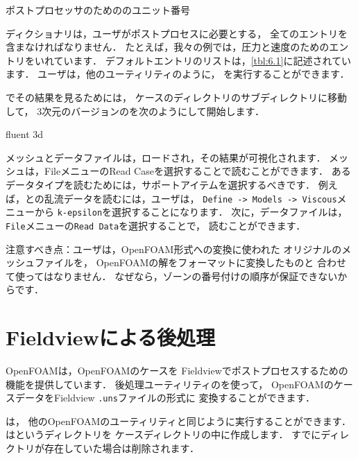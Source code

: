 \begin{table}[ht]
 
 \caption{ポストプロセッサのためののユニット番号}
 \label{tbl:6.1}
\end{table}


ディクショナリは，ユーザがポストプロセスに必要とする，
全てのエントリを含まなければなりません．
たとえば，我々の例では，圧力と速度のためのエントリをいれています．
デフォルトエントリのリストは，\autoref{tbl:6.1}に記述されています．
ユーザは，他のユーティリティのように，
を実行することができます．

でその結果を見るためには，
ケースのディレクトリのサブディレクトリに移動して，
3次元のバージョンのを次のようにして開始します．
\begin{OFverbatim}[terminal]
fluent 3d
\end{OFverbatim}
メッシュとデータファイルは，ロードされ，その結果が可視化されます．
メッシュは，FileメニューのRead Caseを選択することで読むことができます．
あるデータタイプを読むためには，サポートアイテムを選択するべきです．
例えば，との乱流データを読むには，ユーザは，
\texttt{Define -> Models -> Viscous}メニューから
\texttt{k-epsilon}を選択することになります．
次に，データファイルは，\texttt{File}メニューの\texttt{Read Data}を選択することで，
読むことができます．

注意すべき点：ユーザは，OpenFOAM形式への変換に使われた
オリジナルのメッシュファイルを，
OpenFOAMの解をフォーマットに変換したものと
合わせて使ってはなりません．
なぜなら，ゾーンの番号付けの順序が保証できないからです．



\section{Fieldviewによる後処理}
\label{sec:6.3}
OpenFOAMは，OpenFOAMのケースを
Fieldviewでポストプロセスするための機能を提供しています．
後処理ユーティリティのを使って，
OpenFOAMのケースデータをFieldview \texttt{.uns}ファイルの形式に
変換することができます．

は，
他のOpenFOAMのユーティリティと同じように実行することができます．
はというディレクトリを
ケースディレクトリの中に作成します．
すでにディレクトリが存在していた場合は削除されます．

